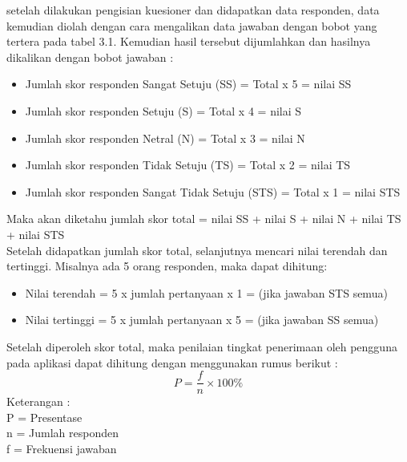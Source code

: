 \begin{flushleft}
\begin{justify}
\begin{table}[ht]
\begin{tabular}{|>{\raggedright}p{5cm}|p{2.5cm}|>{\raggedright}p{5cm}|}
             \tabularnewline
           \hline
          \end{tabular}
         \end{table}
         \newline setelah dilakukan pengisian kuesioner dan didapatkan data responden, data kemudian diolah dengan cara mengalikan data jawaban dengan bobot yang tertera pada tabel 3.1. Kemudian hasil tersebut dijumlahkan dan hasilnya dikalikan dengan bobot jawaban :
         \begin{itemize}
            \item Jumlah skor responden Sangat Setuju (SS)  = Total x 5 = nilai SS
            \item Jumlah skor responden Setuju (S)  = Total x 4 = nilai S
            \item Jumlah skor responden Netral (N)  = Total x 3 = nilai N
            \item Jumlah skor responden Tidak Setuju (TS)  = Total x 2 = nilai TS
            \item Jumlah skor responden Sangat Tidak Setuju (STS)  = Total x 1 = nilai STS
         \end{itemize}
         Maka akan diketahu jumlah skor total = nilai SS + nilai S + nilai N + nilai TS + nilai STS
         \\\newline Setelah didapatkan jumlah skor total, selanjutnya mencari nilai terendah dan tertinggi. Misalnya ada 5 orang responden, maka dapat dihitung:
         \begin{itemize}
            \item Nilai terendah = 5 x jumlah pertanyaan x 1 = (jika jawaban STS semua)
            \item Nilai tertinggi = 5 x jumlah pertanyaan x 5 = (jika jawaban SS semua)
         \end{itemize}
         \noindent Setelah diperoleh skor total, maka penilaian tingkat penerimaan oleh pengguna pada aplikasi dapat dihitung dengan menggunakan rumus berikut \cite{kuantitatif}:
         \begin{equation}
            P = \frac{f}{n} \times 100\%
         \end{equation}
         \noindent Keterangan :
         \\P = Presentase
         \\n = Jumlah responden
         \\f = Frekuensi jawaban\\


\end{justify}
\end{flushleft}
